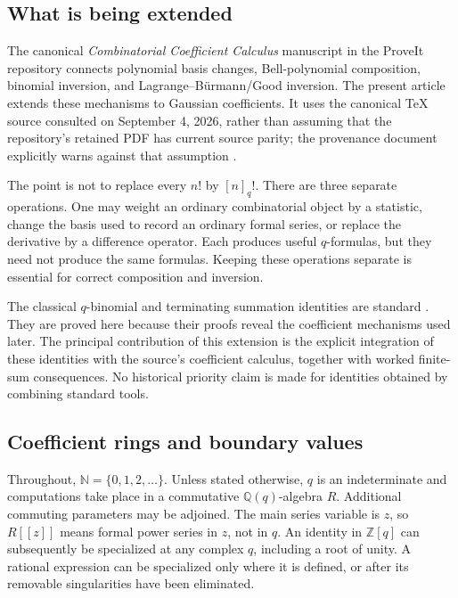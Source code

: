 \documentclass[11pt,a4paper]{article}
\numberwithin{equation}{section}
\theoremstyle{definition}
\theoremstyle{remark}
\newcommand{\Q}{\mathbb Q}
\newcommand{\Z}{\mathbb Z}
\newcommand{\N}{\mathbb N}
\newcommand{\qf}[1]{[#1]_{q}!}
\begin{document}
\subsection{What is being extended}
The canonical \emph{Combinatorial Coefficient Calculus} manuscript in the ProveIt
repository \cite{CCC} connects polynomial basis changes, Bell-polynomial
composition, binomial inversion, and Lagrange--B\"urmann/Good inversion. The present
article extends these mechanisms to Gaussian coefficients. It uses the canonical
\TeX{} source consulted on September 4, 2026, rather than assuming that the
repository's retained PDF has current source parity; the provenance document
explicitly warns against that assumption \cite{provenance}.

The point is not to replace every $n!$ by $\qf n$. There are three separate
operations. One may weight an ordinary combinatorial object by a statistic, change
the basis used to record an ordinary formal series, or replace the derivative by
a difference operator. Each produces useful $q$-formulas, but they need not produce
the same formulas. Keeping these operations separate is essential for correct
composition and inversion.

The classical $q$-binomial and terminating summation identities are standard
\cite{DLMF17,DLMF175,DLMF176}. They are proved here because their proofs reveal the
coefficient mechanisms used later. The principal contribution of this extension
is the explicit integration of these identities with the source's coefficient
calculus, together with worked finite-sum consequences. No historical priority
claim is made for identities obtained by combining standard tools.

\subsection{Coefficient rings and boundary values}
Throughout, $\N=\{0,1,2,\ldots\}$. Unless stated otherwise, $q$ is an
indeterminate and computations take place in a
commutative $\Q(q)$-algebra $R$. Additional commuting parameters may be adjoined.
The main series variable is $z$, so $R[[z]]$ means formal power series in $z$,
not in $q$. An identity in $\Z[q]$ can subsequently be specialized at any complex
$q$, including a root of unity. A rational expression can be specialized only
where it is defined, or after its removable singularities have been eliminated.
\end{document}

